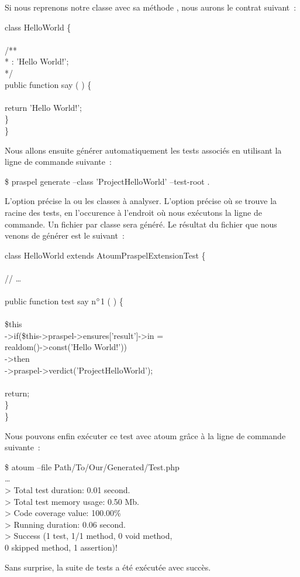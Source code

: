 Si nous reprenons notre classe  avec sa méthode
, nous aurons le contrat suivant~:
%
\begin{pre}
class HelloWorld \{ \\
 \\
    /** \\
     * \aensures \aresult: 'Hello World!'; \\
     */ \\
    public function say ( ) \{ \\
 \\
        return 'Hello World!'; \\
    \} \\
\}
\end{pre}
%
Nous allons ensuite générer automatiquement les tests associés en utilisant la
ligne de commande suivante~:
%
\begin{pre}
\$ praspel generate --class 'Project\bslash{}HelloWorld' --test-root .
\end{pre}
%
L'option  précise la ou les classes à analyser. L'option
 précise où se trouve la racine des tests, en
l'occurence à l'endroit où nous exécutons la ligne de commande. Un fichier par
classe sera généré. Le résultat du fichier que nous venons de générer est le
suivant~:
%
\begin{bigpre}
class HelloWorld extends \bslash{}Atoum\bslash{}PraspelExtension\bslash{}Test \{ \\
 \\
    // … \\
 \\
    public function test say n\(\sp{\circ}\)1 ( ) \{ \\
 \\
        \$this \\
            ->if(\$this->praspel->ensures['\bslash{}result']->in = \\
                realdom()->const('Hello World!')) \\
            ->then \\
                ->praspel->verdict('\bslash{}Project\bslash{}HelloWorld');  \\
 \\
        return; \\
    \} \\
\}
\end{bigpre}
%
Nous pouvons enfin exécuter ce test avec atoum grâce à la ligne de commande
suivante~:
%
\begin{pre}
\$ atoum --file Path/To/Our/Generated/Test.php \\
… \\
> Total test duration: 0.01 second. \\
> Total test memory usage: 0.50 Mb. \\
> Code coverage value: 100.00\% \\
> Running duration: 0.06 second. \\
> Success (1 test, 1/1 method, 0 void method, \\
           0 skipped method, 1 assertion)!
\end{pre}
%
Sans surprise, la suite de tests a été exécutée avec succès.

